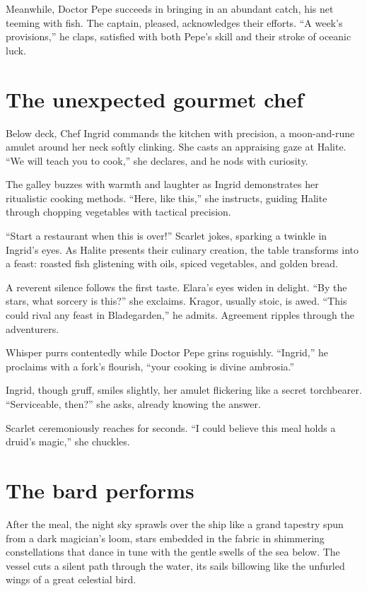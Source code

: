 \documentclass[
  letterpaper,12pt,twoside,twocolumn,openany,
  nodeprecatedcode,bg=full]{dndbook}
\begin{document}
Meanwhile, Doctor Pepe succeeds in bringing in an abundant catch, his
net teeming with fish. The captain, pleased, acknowledges their efforts.
``A week's provisions,'' he claps, satisfied with both Pepe's skill and
their stroke of oceanic luck.

\section{The unexpected gourmet chef}\label{the-unexpected-gourmet-chef}

Below deck, Chef Ingrid commands the kitchen with precision, a
moon-and-rune amulet around her neck softly clinking. She casts an
appraising gaze at Halite. ``We will teach you to cook,'' she declares,
and he nods with curiosity.

The galley buzzes with warmth and laughter as Ingrid demonstrates her
ritualistic cooking methods. ``Here, like this,'' she instructs, guiding
Halite through chopping vegetables with tactical precision.

``Start a restaurant when this is over!'' Scarlet jokes, sparking a
twinkle in Ingrid's eyes. As Halite presents their culinary creation,
the table transforms into a feast: roasted fish glistening with oils,
spiced vegetables, and golden bread.

A reverent silence follows the first taste. Elara's eyes widen in
delight. ``By the stars, what sorcery is this?'' she exclaims. Kragor,
usually stoic, is awed. ``This could rival any feast in Bladegarden,''
he admits. Agreement ripples through the adventurers.

Whisper purrs contentedly while Doctor Pepe grins roguishly. ``Ingrid,''
he proclaims with a fork's flourish, ``your cooking is divine
ambrosia.''

Ingrid, though gruff, smiles slightly, her amulet flickering like a
secret torchbearer. ``Serviceable, then?'' she asks, already knowing the
answer.

Scarlet ceremoniously reaches for seconds. ``I could believe this meal
holds a druid's magic,'' she chuckles.

\section{The bard performs}\label{the-bard-performs}

After the meal, the night sky sprawls over the ship like a grand
tapestry spun from a dark magician's loom, stars embedded in the fabric
in shimmering constellations that dance in tune with the gentle swells
of the sea below. The vessel cuts a silent path through the water, its
sails billowing like the unfurled wings of a great celestial bird.
\end{document}
